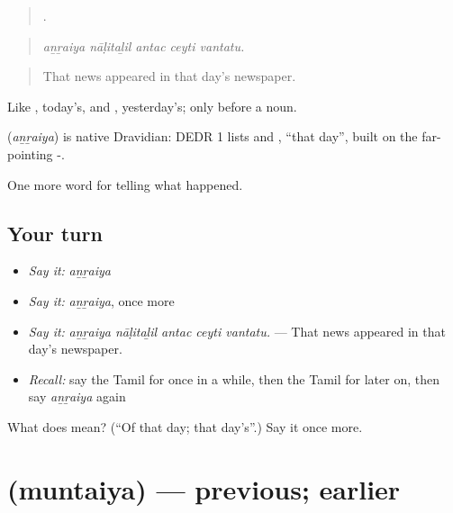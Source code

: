 \begin{quote}
    .
\end{quote}

\begin{quote}
\emph{aṉṟaiya nāḷitaḻil antac ceyti vantatu.}
\end{quote}

\begin{quote}
That news appeared in that day's newspaper.
\end{quote}

Like , today's, and , yesterday's; only before a noun.

\begin{cousinweb}
\textbf{} (\emph{aṉṟaiya}) is native Dravidian: DEDR 1 lists  and , \textquotedblleft{}that day\textquotedblright{}, built on the far-pointing -.
\end{cousinweb}

\begin{grammarlens}[title={What you've built}]
One more word for telling what happened.
\end{grammarlens}

\subsection*{Your turn}
\begin{itemize}
\raggedright
  \item \emph{Say it:} \emph{aṉṟaiya}
  \item \emph{Say it:} \emph{aṉṟaiya}, once more
  \item \emph{Say it:} \emph{aṉṟaiya nāḷitaḻil antac ceyti vantatu.} — That news appeared in that day's newspaper.
  \item \emph{Recall:} say the Tamil for once in a while, then the Tamil for later on, then say \emph{aṉṟaiya} again
\end{itemize}

\begin{tcolorbox}[breakable,colback=teal!4,colframe=teal!35!black,title={Before you move on}]
What does  mean? (\textquotedblleft{}Of that day; that day's\textquotedblright{}.) Say it once more.
\end{tcolorbox}
\section[\texorpdfstring{\ta{முந்தைய} (muntaiya)}{முந்தைய (muntaiya)}]{ (muntaiya) — previous; earlier}

